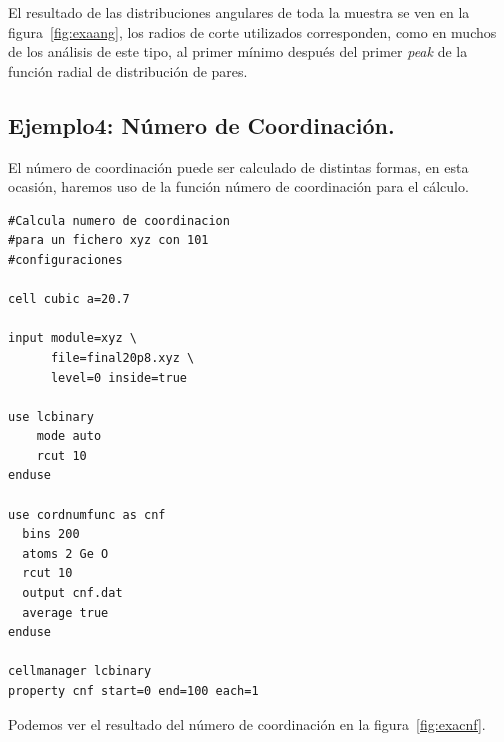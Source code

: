 El resultado de las distribuciones angulares de toda la muestra se ven en la figura~\ref{fig:exaang}, los radios de corte utilizados corresponden, como en muchos de los an\'alisis de este tipo, al primer m\'inimo despu\'es del primer \textit{peak} de la funci\'on radial de distribuci\'on de pares.


\subsection{Ejemplo4: N\'umero de Coordinaci\'on.}

El n\'umero de coordinaci\'on puede ser calculado de distintas formas, en esta ocasi\'on, haremos uso de la funci\'on n\'umero de coordinaci\'on para el c\'alculo.

\begin{multicols}{2}
\setlength{\columnseprule}{.5pt}
\begin{verbatim}
#Calcula numero de coordinacion
#para un fichero xyz con 101
#configuraciones

cell cubic a=20.7

input module=xyz \
      file=final20p8.xyz \
      level=0 inside=true

use lcbinary
    mode auto
    rcut 10 
enduse

use cordnumfunc as cnf
  bins 200
  atoms 2 Ge O
  rcut 10
  output cnf.dat
  average true
enduse

cellmanager lcbinary
property cnf start=0 end=100 each=1
\end{verbatim}
\end{multicols}

Podemos ver el resultado del n\'umero de coordinaci\'on en la figura~\ref{fig:exacnf}.


% 
% 
% 
% 
% 
% 


